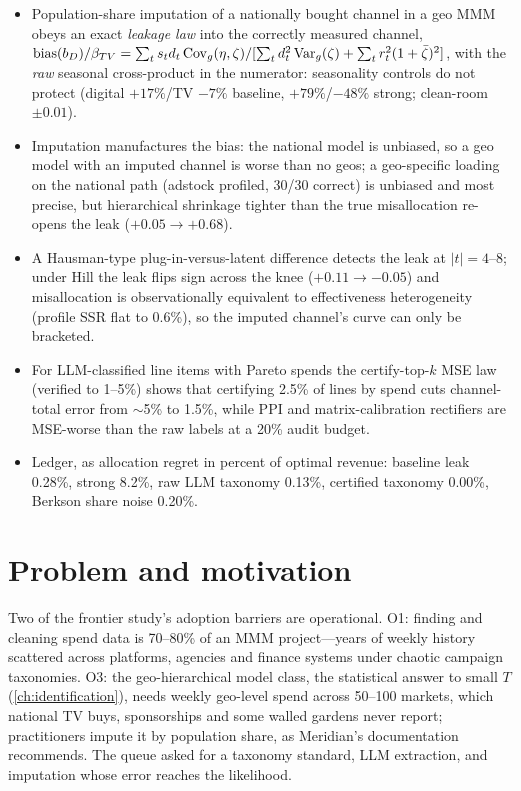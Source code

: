 \begin{keyideas}
\begin{itemize}
\item Population-share imputation of a nationally bought channel in a geo MMM obeys an exact \emph{leakage law} into the correctly measured channel, $\mathrm{bias}(b_D)/\beta_{TV} = \sum_t s_td_t\operatorname{Cov}_g(\eta,\zeta)/[\sum_t d_t^2\operatorname{Var}_g(\zeta)+\sum_t r_t^2(1+\bar\zeta)^2]$, with the \emph{raw} seasonal cross-product in the numerator: seasonality controls do not protect (digital $+17\%$/TV $-7\%$ baseline, $+79\%$/$-48\%$ strong; clean-room $\pm0.01$).
\item Imputation manufactures the bias: the national model is unbiased, so a geo model with an imputed channel is worse than no geos; a geo-specific loading on the national path (adstock profiled, 30/30 correct) is unbiased and most precise, but hierarchical shrinkage tighter than the true misallocation re-opens the leak ($+0.05 \to +0.68$).
\item A Hausman-type plug-in-versus-latent difference detects the leak at $|t| = 4$--$8$; under Hill the leak flips sign across the knee ($+0.11 \to -0.05$) and misallocation is observationally equivalent to effectiveness heterogeneity (profile SSR flat to 0.6\%), so the imputed channel's curve can only be bracketed.
\item For LLM-classified line items with Pareto spends the certify-top-$k$ MSE law (verified to 1--5\%) shows that certifying 2.5\% of lines by spend cuts channel-total error from $\sim$5\% to 1.5\%, while PPI and matrix-calibration rectifiers are MSE-worse than the raw labels at a 20\% audit budget.
\item Ledger, as allocation regret in percent of optimal revenue: baseline leak 0.28\%, strong 8.2\%, raw LLM taxonomy 0.13\%, certified taxonomy 0.00\%, Berkson share noise 0.20\%.
\end{itemize}
\end{keyideas}

\section{Problem and motivation}

Two of the frontier study's adoption barriers are operational. O1: finding and cleaning spend data is 70--80\% of an MMM project---years of weekly history scattered across platforms, agencies and finance systems under chaotic campaign taxonomies. O3: the geo-hierarchical model class, the statistical answer to small $T$ (\cref{ch:identification}), needs weekly geo-level spend across 50--100 markets, which national TV buys, sponsorships and some walled gardens never report; practitioners impute it by population share, as Meridian's documentation recommends. The queue asked for a taxonomy standard, LLM extraction, and imputation whose error reaches the likelihood.

